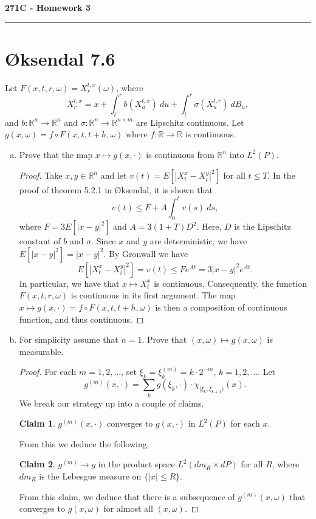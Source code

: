 \documentclass[11pt,letterpaper]{report}
\newcommand{\reals}{\mathbb{R}}
\theoremstyle{definition}
\newtheorem{claim}{Claim}
\begin{document}
\begin{center}
{\bf \Large 271C - Homework 3}
\vspace{0.2cm}
\hrule
\end{center}

\section*{\O ksendal 7.6}
Let $F(x, t, r, \omega) = X_r^{t, x}(\omega)$, where
\[
X_r^{t, x} = x + \int_t^rb(X_u^{t, x})\ du + \int_t^r\sigma(X_u^{t, r})\ dB_u,
\]
and $b: \reals^n\to \reals^n$ and $\sigma: \reals^n\to \reals^{n\times m}$ are Lipschitz continuous. Let $g(x, \omega) = f\circ F(x, t, t+h, \omega)$ where $f:\reals\to \reals$ is continuous.
\begin{enumerate}[(a)]
	\item Prove that the map $x\mapsto g(x, \cdot)$ is continuous from $\reals^n$ into $L^2(P)$.
	\begin{proof}
		Take $x,y\in \reals^n$ and let $v(t) = E[|X_t^x - X_t^y|^2]$ for all $t\leq T$. In the proof of theorem 5.2.1 in \O ksendal, it is shown that
		\[
		v(t) \leq F + A\int_0^tv(s)\ ds,
		\]
		where $F= 3E[|x-y|^2]$ and $A = 3(1+T)D^2$. Here, $D$ is the Lipschitz constant of $b$ and $\sigma$. Since $x$ and $y$ are deterministic, we have $E[|x-y|^2] = |x-y|^2$. By Gronwall we have
		\[
		E[|X_t^x - X_t^y|^2] = v(t) \leq Fe^{At} = 3|x-y|^2e^{At}.
		\]
		In particular, we have that $x\mapsto X_t^x$ is continuous. Consequently, the function $F(x, t, r, \omega)$ is continuous in its first argument. The map $x\mapsto g(x, \cdot) = f\circ F(x, t, t+h, \omega)$ is then a composition of continuous function, and thus continuous.
	\end{proof}

	\item For simplicity assume that $n=1$. Prove that $(x, \omega)\mapsto g(x, \omega)$ is measurable.
	\begin{proof}
		For each $m = 1, 2, \ldots$, set $\xi_k = \xi_k^{(m)} = k\cdot 2^{-m}$, $k = 1, 2, \ldots$. Let
		\[
		g^{(m)}(x, \cdot) = \sum_kg(\xi_k, \cdot)\cdot \chi_{[\xi_k, \xi_{k+1})}(x).
		\]
		We break our strategy up into a couple of claims.
		\begin{claim}\label{each_x}
			$g^{(m)}(x, \cdot)$ converges to $g(x, \cdot)$ in $L^2(P)$ for each $x$.
		\end{claim}
		From this we deduce the following.
		\begin{claim}\label{product}
			$g^{(m)}\to g$ in the product space $L^2(dm_R\times dP)$ for all $R$, where $dm_R$ is the Lebesgue measure on $\{|x|\leq R\}$.
		\end{claim}
		From this claim, we deduce that there is a subsequence of $g^{(m)}(x, \omega)$ that converges to $g(x, \omega)$ for almost all $(x, \omega)$.
	\end{proof}
\end{enumerate}
\end{document}
